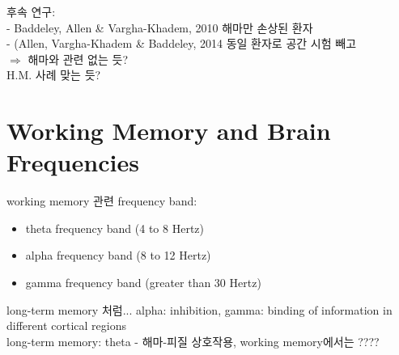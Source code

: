 \documentclass[../note.tex]{subfiles}
\begin{document}
후속 연구:\\
- Baddeley, Allen & Vargha-Khadem, 2010 해마만 손상된 환자\\
- (Allen, Vargha-Khadem & Baddeley, 2014 동일 환자로 공간 시험 빼고\\
$\Longrightarrow$ 해마와 관련 없는 듯?\\
H.M. 사례 맞는 듯?

\section{Working Memory and Brain Frequencies}
working memory 관련 frequency band:\\
\begin{itemize}
  \item theta frequency band (4 to 8 Hertz)
  \item alpha frequency band (8 to 12 Hertz)
  \item gamma frequency band (greater than 30 Hertz)
\end{itemize}
long-term memory 처럼... alpha: inhibition, gamma: binding of information in different cortical regions\\
long-term memory: theta - 해마-피질 상호작용, working memory에서는 ????
\end{document}
